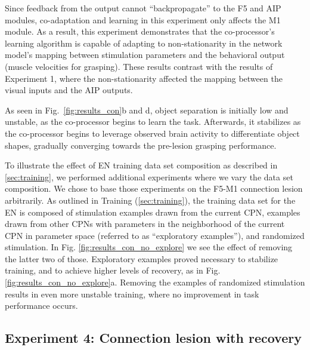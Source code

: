 \documentclass[12pt]{iopart}
\begin{document}
Since feedback from the output cannot ``backpropagate'' to the F5 and AIP modules, co-adaptation and
learning in this experiment only affects the M1 module. As a result, this experiment demonstrates
that the co-processor's learning algorithm is capable of adapting to non-stationarity
in the network model's mapping between stimulation parameters and the behavioral output (muscle velocities
for grasping). These results contrast  with the results of Experiment 1, where the non-stationarity affected
the mapping between the visual inputs and the AIP outputs.

As seen in Fig.~\ref{fig:results_con}b and d, object separation is initially low and unstable, as the
co-processor begins to learn the task. Afterwards, it stabilizes as the co-processor begins to
leverage observed brain activity to differentiate object shapes, gradually converging towards the
pre-lesion grasping performance.

To illustrate the effect of EN training data set composition as described in \ref{sec:training}, we
performed additional experiments where we vary the data set composition. We chose to base those
experiments on the F5-M1 connection lesion arbitrarily. As outlined in Training (\ref{sec:training}),
the training data set for the EN is composed of stimulation examples drawn from the current CPN,
examples drawn from other CPNs with parameters in the neighborhood of the current CPN in parameter
space (referred to as ``exploratory examples''), and randomized stimulation. In Fig.
\ref{fig:results_con_no_explore} we see the effect of removing the latter two of those.
Exploratory examples proved necessary to stabilize training, and to achieve higher levels of recovery,
as in Fig. \ref{fig:results_con_no_explore}a. Removing the examples of randomized stimulation results in
even more unstable training, where no improvement in task performance occurs.

\subsection{Experiment 4: Connection lesion with recovery}
\end{document}
